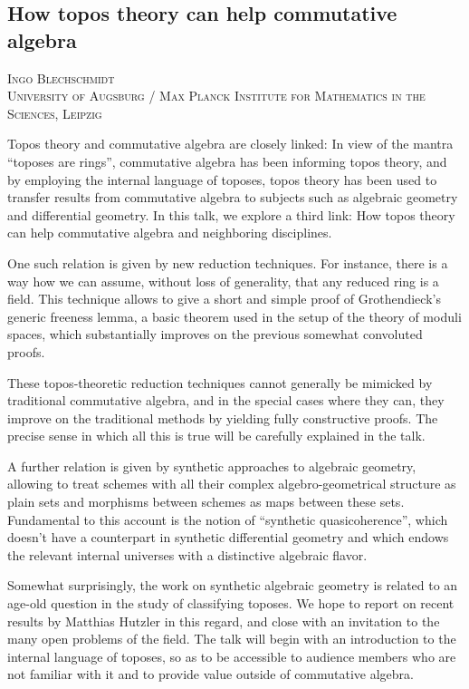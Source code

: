 \documentclass{article}
\begin{document}
\subsection*{How topos theory can help commutative algebra}

\noindent
{\scshape Ingo Blechschmidt}\\
{\scshape University of Augsburg / Max Planck Institute for
Mathematics in the Sciences, Leipzig}
\medskip

Topos theory and commutative algebra are closely linked: In view of the mantra
``toposes are rings'', commutative algebra has been informing topos theory, and
by employing the internal language of toposes, topos theory has been used to
transfer results from commutative algebra to subjects such as algebraic
geometry and differential geometry. In this talk, we explore a third link: How
topos theory can help commutative algebra and neighboring disciplines.

One such relation is given by new reduction techniques. For instance, there is
a way how we can assume, without loss of generality, that any reduced ring is a
field. This technique allows to give a short and simple proof of Grothendieck's
generic freeness lemma, a basic theorem used in the setup of the theory of
moduli spaces, which substantially improves on the previous somewhat
convoluted proofs.

These topos-theoretic reduction techniques cannot generally be mimicked by traditional
commutative algebra, and in the special cases where they can,
they improve on the traditional methods by yielding fully constructive proofs.
The precise sense in which all this is true will be carefully explained in the
talk.

A further relation is given by synthetic approaches to algebraic geometry,
allowing to treat schemes with all their complex algebro-geometrical structure
as plain sets and morphisms between schemes as maps between these sets.
Fundamental to this account is the notion of ``synthetic quasicoherence'',
which doesn't have a counterpart in synthetic differential geometry and which
endows the relevant internal universes with a distinctive algebraic flavor.

Somewhat surprisingly, the work on synthetic algebraic geometry is related to
an age-old question in the study of classifying toposes. We hope to report on
recent results by Matthias Hutzler in this regard, and close with an invitation
to the many open problems of the field. The talk will begin with an
introduction to the internal language of toposes, so as to be accessible to
audience members who are not familiar with it and to provide value
outside of commutative algebra.
\end{document}
